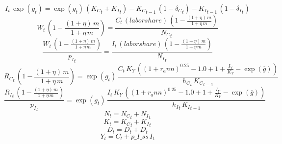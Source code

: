 \begin{dmath}
{{I}}_{t}\, \exp\left({{g}}_{t}\right)=\exp\left({{g}}_{t}\right)\, \left({{K_C}}_{t}+{{K_I}}_{t}\right)-{{K_C}}_{t-1}\, \left(1-{{\delta_C}}_{t}\right)-{{K_I}}_{t-1}\, \left(1-{{\delta_I}}_{t}\right)
\end{dmath}
\begin{dmath}
{{W}}_{t}\, \left(1-\frac{\left(1+{{\eta}}\right)\, {{m}}}{1+{{\eta}}\, {{m}}}\right)=\frac{{{C}}_{t}\, {(labor share)}\, \left(1-\frac{\left(1+{{\eta}}\right)\, {{m}}}{1+{{\eta}}\, {{m}}}\right)}{{{N_C}}_{t}}
\end{dmath}
\begin{dmath}
\frac{{{W}}_{t}\, \left(1-\frac{\left(1+{{\eta}}\right)\, {{m}}}{1+{{\eta}}\, {{m}}}\right)}{{{p_I}}_{t}}=\frac{{{I}}_{t}\, {(labor share)}\, \left(1-\frac{\left(1+{{\eta}}\right)\, {{m}}}{1+{{\eta}}\, {{m}}}\right)}{{{N_I}}_{t}}
\end{dmath}
\begin{dmath}
{{R_C}}_{t}\, \left(1-\frac{\left(1+{{\eta}}\right)\, {{m}}}{1+{{\eta}}\, {{m}}}\right)=\exp\left({{g}}_{t}\right)\, \frac{{{C}}_{t}\, {{K_Y}}\, \left(\left(1+{{r_ann}}\right)^{0.25}-1.0+1+\frac{{{I_Y}}}{{{K_Y}}}-\exp\left({{\overline{g}}}\right)\right)}{{{h_C}}_{t}\, {{K_C}}_{t-1}}
\end{dmath}
\begin{dmath}
\frac{{{R_I}}_{t}\, \left(1-\frac{\left(1+{{\eta}}\right)\, {{m}}}{1+{{\eta}}\, {{m}}}\right)}{{{p_I}}_{t}}=\exp\left({{g}}_{t}\right)\, \frac{{{I}}_{t}\, {{K_Y}}\, \left(\left(1+{{r_ann}}\right)^{0.25}-1.0+1+\frac{{{I_Y}}}{{{K_Y}}}-\exp\left({{\overline{g}}}\right)\right)}{{{h_I}}_{t}\, {{K_I}}_{t-1}}
\end{dmath}
\begin{dmath}
{{N}}_{t}={{N_C}}_{t}+{{N_I}}_{t}
\end{dmath}
\begin{dmath}
{{K}}_{t}={{K_C}}_{t}+{{K_I}}_{t}
\end{dmath}
\begin{dmath}
{{D}}_{t}={{D}}_{t}+{{D}}_{t}
\end{dmath}
\begin{dmath}
{{Y}}_{t}={{C}}_{t}+{p\_I\_ss}\, {{I}}_{t}
\end{dmath}
